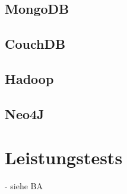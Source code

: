 \subsection{MongoDB}

\subsection{CouchDB}

\subsection{Hadoop}

\subsection{Neo4J}


\section{Leistungstests}

- siehe BA